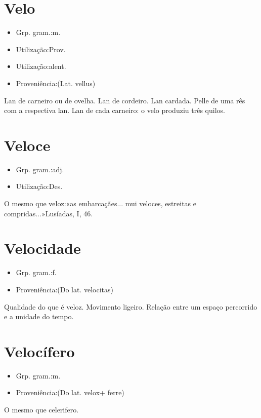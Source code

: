 \documentclass{article}
\begin{document}
\section{Velo}
\begin{itemize}
\item {Grp. gram.:m.}
\end{itemize}
\begin{itemize}
\item {Utilização:Prov.}
\end{itemize}
\begin{itemize}
\item {Utilização:alent.}
\end{itemize}
\begin{itemize}
\item {Proveniência:(Lat. \textunderscore vellus\textunderscore )}
\end{itemize}
Lan de carneiro ou de ovelha.
Lan de cordeiro.
Lan cardada.
Pelle de uma rês com a respectiva lan.
Lan de cada carneiro: \textunderscore o velo produziu três quilos\textunderscore .
\section{Veloce}
\begin{itemize}
\item {Grp. gram.:adj.}
\end{itemize}
\begin{itemize}
\item {Utilização:Des.}
\end{itemize}
O mesmo que \textunderscore veloz\textunderscore :«\textunderscore as embarcaçães... mui veloces, estreitas e compridas...\textunderscore »\textunderscore Lusíadas\textunderscore , I, 46.
\section{Velocidade}
\begin{itemize}
\item {Grp. gram.:f.}
\end{itemize}
\begin{itemize}
\item {Proveniência:(Do lat. \textunderscore velocitas\textunderscore )}
\end{itemize}
Qualidade do que é veloz.
Movimento ligeiro.
Relação entre um espaço percorrido e a unidade do tempo.
\section{Velocífero}
\begin{itemize}
\item {Grp. gram.:m.}
\end{itemize}
\begin{itemize}
\item {Proveniência:(Do lat. \textunderscore velox\textunderscore  + \textunderscore ferre\textunderscore )}
\end{itemize}
O mesmo que \textunderscore celerifero\textunderscore .
\end{document}
